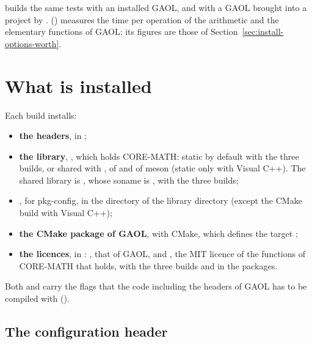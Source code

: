 \noindent
{} builds the same tests with an installed GAOL, and
 with a GAOL brought into a project by
.  ()
measures the time per operation of the arithmetic and the elementary
functions of GAOL; its figures are those of
Section~\ref{sec:install-options-worth}.

\section{What is installed}\label{sec:install-installed}

Each build installs:
\begin{itemize}
\item[$\bullet$] \textbf{the headers}, in ;
\item[$\bullet$] \textbf{the library}, , which holds CORE-MATH:
  static by default with the three builds, or shared with
  ,
   of  and
   of meson (static only with Visual C++).
  The shared library is , whose soname is
  , with the three builds;
\item[$\bullet$] \textbf{}, for pkg-config, in the
   directory of the library directory (except the CMake build
  with Visual C++);
\item[$\bullet$] \textbf{the CMake package of GAOL}, with CMake, which defines
  the target ;
\item[$\bullet$] \textbf{the licences}, in :
  , that of GAOL, and , the MIT
  licence of the functions of CORE-MATH that  holds, with the
  three builds and in the packages.\newinvfive
\end{itemize}

\noindent
Both  and  carry the flags that the code
including the headers of GAOL has to be compiled with ().

\subsection{The configuration header}\label{sec:install-configuration-header}
%

